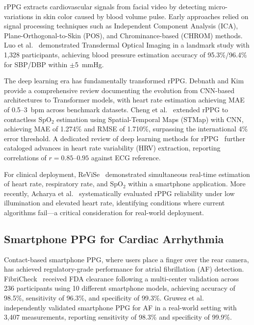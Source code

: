 \documentclass[conference]{IEEEtran}
\begin{document}
rPPG extracts cardiovascular signals from facial video by detecting micro-variations in skin color caused by blood volume pulse. Early approaches relied on signal processing techniques such as Independent Component Analysis (ICA), Plane-Orthogonal-to-Skin (POS), and Chrominance-based (CHROM) methods. Luo et al.~\cite{luo2019smartphone} demonstrated Transdermal Optical Imaging in a landmark study with 1,328 participants, achieving blood pressure estimation accuracy of 95.3\%/96.4\% for SBP/DBP within $\pm$5~mmHg.

The deep learning era has fundamentally transformed rPPG. Debnath and Kim~\cite{debnath2025comprehensive} provide a comprehensive review documenting the evolution from CNN-based architectures to Transformer models, with heart rate estimation achieving MAE of 0.5--3~bpm across benchmark datasets. Cheng et al.~\cite{cheng2024contactless} extended rPPG to contactless SpO$_2$ estimation using Spatial-Temporal Maps (STMap) with CNN, achieving MAE of 1.274\% and RMSE of 1.710\%, surpassing the international 4\% error threshold. A dedicated review of deep learning methods for rPPG~\cite{rppgreview2024frontiers} further cataloged advances in heart rate variability (HRV) extraction, reporting correlations of $r=0.85$--$0.95$ against ECG reference.

For clinical deployment, ReViSe~\cite{revise2022} demonstrated simultaneous real-time estimation of heart rate, respiratory rate, and SpO$_2$ within a smartphone application. More recently, Acharya et al.~\cite{acharya2025reliability} systematically evaluated rPPG reliability under low illumination and elevated heart rate, identifying conditions where current algorithms fail---a critical consideration for real-world deployment.

\subsection{Smartphone PPG for Cardiac Arrhythmia}

Contact-based smartphone PPG, where users place a finger over the rear camera, has achieved regulatory-grade performance for atrial fibrillation (AF) detection. FibriCheck~\cite{fibricheck2025} received FDA clearance following a multi-center validation across 236 participants using 10 different smartphone models, achieving accuracy of 98.5\%, sensitivity of 96.3\%, and specificity of 99.3\%. Gruwez et al.~\cite{gruwez2024realworld} independently validated smartphone PPG for AF in a real-world setting with 3,407 measurements, reporting sensitivity of 98.3\% and specificity of 99.9\%.
\end{document}
